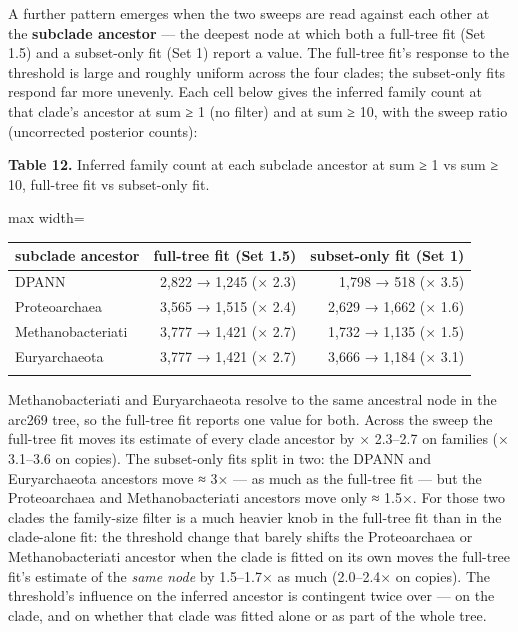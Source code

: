 \documentclass[
  10pt,
]{article}
\begin{document}
A further pattern emerges when the two sweeps are read against each
other at the \textbf{subclade ancestor} --- the deepest node at which
both a full-tree fit (Set 1.5) and a subset-only fit (Set 1) report a
value. The full-tree fit's response to the threshold is large and
roughly uniform across the four clades; the subset-only fits respond far
more unevenly. Each cell below gives the inferred family count at that
clade's ancestor at sum ≥ 1 (no filter) and at sum ≥ 10, with the sweep
ratio (uncorrected posterior counts):

\textbf{Table 12.} Inferred family count at each subclade ancestor at
sum ≥ 1 vs sum ≥ 10, full-tree fit vs subset-only fit.

\begin{center}
\begin{adjustbox}{max width=\textwidth}
\begin{tabular}{@{}lrr@{}}
\toprule\noalign{}
subclade ancestor & full-tree fit (Set 1.5) & subset-only fit (Set 1) \\
\midrule\noalign{}
DPANN & 2,822 → 1,245 (× 2.3) & 1,798 → 518 (× 3.5) \\
Proteoarchaea & 3,565 → 1,515 (× 2.4) & 2,629 → 1,662 (× 1.6) \\
Methanobacteriati & 3,777 → 1,421 (× 2.7) & 1,732 → 1,135 (× 1.5) \\
Euryarchaeota & 3,777 → 1,421 (× 2.7) & 3,666 → 1,184 (× 3.1) \\
\bottomrule\noalign{}
\end{tabular}
\end{adjustbox}
\end{center}

Methanobacteriati and Euryarchaeota resolve to the same ancestral node
in the arc269 tree, so the full-tree fit reports one value for both.
Across the sweep the full-tree fit moves its estimate of every clade
ancestor by × 2.3--2.7 on families (× 3.1--3.6 on copies). The
subset-only fits split in two: the DPANN and Euryarchaeota ancestors
move ≈ 3× --- as much as the full-tree fit --- but the Proteoarchaea and
Methanobacteriati ancestors move only ≈ 1.5×. For those two clades the
family-size filter is a much heavier knob in the full-tree fit than in
the clade-alone fit: the threshold change that barely shifts the
Proteoarchaea or Methanobacteriati ancestor when the clade is fitted on
its own moves the full-tree fit's estimate of the \emph{same node} by
1.5--1.7× as much (2.0--2.4× on copies). The threshold's influence on
the inferred ancestor is contingent twice over --- on the clade, and on
whether that clade was fitted alone or as part of the whole tree.
\end{document}
